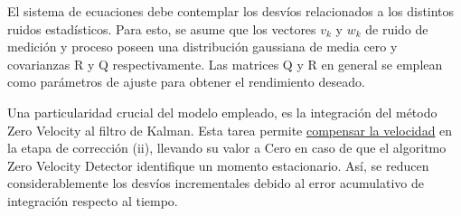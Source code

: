 El sistema de ecuaciones debe contemplar los desvíos relacionados a los distintos ruidos estadísticos. Para esto, se asume que los vectores $v_k$ y $w_k$ de ruido de medición y proceso poseen una distribución gaussiana de media cero y covarianzas R y Q respectivamente. Las matrices Q y R en general se emplean como parámetros de ajuste para obtener el rendimiento deseado.

Una particularidad crucial del modelo empleado, es la integración del método Zero Velocity al filtro de Kalman. Esta tarea permite \underline{compensar la velocidad} en la etapa de corrección (ii), llevando su valor a Cero en caso de que el algoritmo Zero Velocity Detector identifique un momento estacionario. Así, se reducen considerablemente los desvíos incrementales debido al error acumulativo de integración respecto al tiempo.

